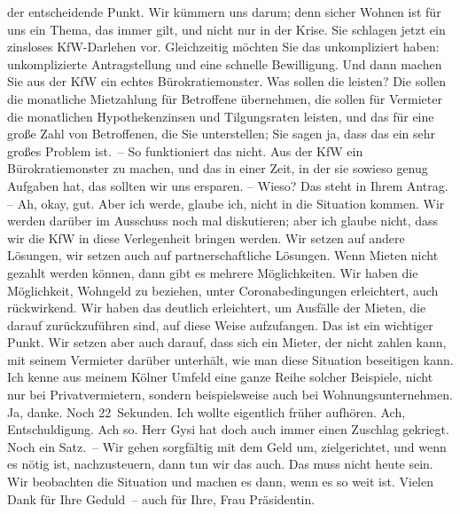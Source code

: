 \documentclass{article}
\begin{document}
der entscheidende Punkt. Wir kümmern uns darum; denn sicher Wohnen ist für uns ein Thema, das immer gilt, und nicht nur in der Krise.  Sie schlagen jetzt ein zinsloses KfW-Darlehen vor. Gleichzeitig möchten Sie das unkompliziert haben: unkomplizierte Antragstellung und eine schnelle Bewilligung. Und dann machen Sie aus der KfW ein echtes Bürokratiemonster. Was sollen die leisten? Die sollen die monatliche Mietzahlung für Betroffene übernehmen, die sollen für Vermieter die monatlichen Hypothekenzinsen und Tilgungsraten leisten, und das für eine große Zahl von Betroffenen, die Sie unterstellen; Sie sagen ja, dass das ein sehr großes Problem ist. – So funktioniert das nicht. Aus der KfW ein Bürokratiemonster zu machen, und das in einer Zeit, in der sie sowieso genug Aufgaben hat, das sollten wir uns ersparen.  – Wieso? Das steht in Ihrem Antrag.  – Ah, okay, gut. Aber ich werde, glaube ich, nicht in die Situation kommen. Wir werden darüber im Ausschuss noch mal diskutieren; aber ich glaube nicht, dass wir die KfW in diese Verlegenheit bringen werden. Wir setzen auf andere Lösungen, wir setzen auch auf partnerschaftliche Lösungen. Wenn Mieten nicht gezahlt werden können, dann gibt es mehrere Möglichkeiten. Wir haben die Möglichkeit, Wohngeld zu beziehen, unter Coronabedingungen erleichtert, auch rückwirkend. Wir haben das deutlich erleichtert, um Ausfälle der Mieten, die darauf zurückzuführen sind, auf diese Weise aufzufangen. Das ist ein wichtiger Punkt. Wir setzen aber auch darauf, dass sich ein Mieter, der nicht zahlen kann, mit seinem Vermieter darüber unterhält, wie man diese Situation beseitigen kann. Ich kenne aus meinem Kölner Umfeld eine ganze Reihe solcher Beispiele, nicht nur bei Privatvermietern, sondern beispielsweise auch bei Wohnungsunternehmen. Ja, danke. Noch 22 Sekunden. Ich wollte eigentlich früher aufhören.  Ach, Entschuldigung. Ach so. Herr Gysi hat doch auch immer einen Zuschlag gekriegt.  Noch ein Satz. – Wir gehen sorgfältig mit dem Geld um, zielgerichtet, und wenn es nötig ist, nachzusteuern, dann tun wir das auch. Das muss nicht heute sein. Wir beobachten die Situation und machen es dann, wenn es so weit ist. Vielen Dank für Ihre Geduld – auch für Ihre, Frau Präsidentin. 
\end{document}

